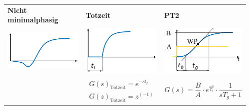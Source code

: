 \begin{tabularx}{\linewidth}{p{0.32\linewidth} p{0.32\linewidth} p{0.32\linewidth}}
	\textbf{Nicht minimalphasig}			&\textbf{Totzeit}				&\textbf{PT2}		\\
	\includegraphics[width=.75\linewidth]{bilder/step1.png}&
	\includegraphics[width=.75\linewidth]{bilder/step2.png}&
	\includegraphics[width=.75\linewidth]{bilder/step3.png} \\
	& \begin{align*}
		G(s)_\text{Totzeit} = e^{-st_t}\\
		G(z)_\text{Totzeit} = z^(-1)
	\end{align*} 
	& \begin{equation*}
	G(s) = \frac{B}{A}\cdot e^{\frac{-s}{T_0}}\cdot \frac{1}{sT_g+1}
	\end{equation*}
\end{tabularx}


